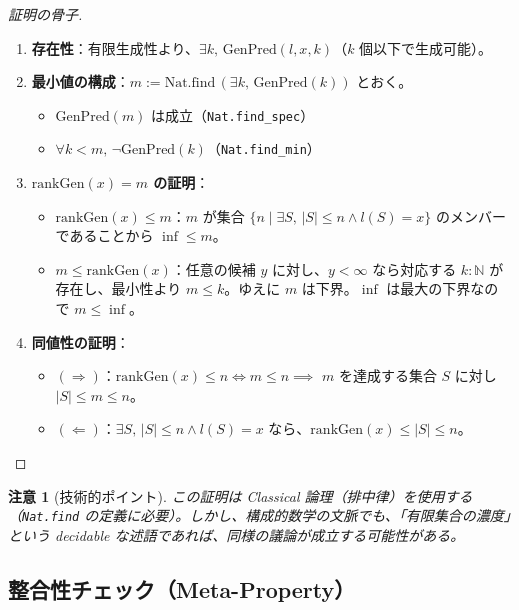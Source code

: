 \documentclass[a4paper,12pt]{ltjsarticle}
\newtheorem{remark}[definition]{注意}
\newcommand{\N}{\mathbb{N}}
\begin{document}
\begin{proof}[証明の骨子]
\begin{enumerate}
  \item \textbf{存在性}：有限生成性より、$\exists k,\, \mathrm{GenPred}(l, x, k)$（$k$ 個以下で生成可能）。

  \item \textbf{最小値の構成}：$m := \mathrm{Nat.find}\, (\exists k,\, \mathrm{GenPred}(k))$ とおく。
  \begin{itemize}
    \item $\mathrm{GenPred}(m)$ は成立（\texttt{Nat.find\_spec}）
    \item $\forall k < m,\, \neg \mathrm{GenPred}(k)$（\texttt{Nat.find\_min}）
  \end{itemize}

  \item \textbf{$\mathrm{rankGen}(x) = m$ の証明}：
  \begin{itemize}
    \item $\mathrm{rankGen}(x) \le m$：$m$ が集合 $\{n \mid \exists S,\, |S| \le n \land l(S) = x\}$ のメンバーであることから $\inf \le m$。
    \item $m \le \mathrm{rankGen}(x)$：任意の候補 $y$ に対し、$y < \infty$ なら対応する $k : \N$ が存在し、最小性より $m \le k$。ゆえに $m$ は下界。$\inf$ は最大の下界なので $m \le \inf$。
  \end{itemize}

  \item \textbf{同値性の証明}：
  \begin{itemize}
    \item $(\Rightarrow)$：$\mathrm{rankGen}(x) \le n \iff m \le n \implies$ $m$ を達成する集合 $S$ に対し $|S| \le m \le n$。
    \item $(\Leftarrow)$：$\exists S,\, |S| \le n \land l(S) = x$ なら、$\mathrm{rankGen}(x) \le |S| \le n$。\qedhere
  \end{itemize}
\end{enumerate}
\end{proof}

\begin{remark}[技術的ポイント]
この証明は Classical 論理（排中律）を使用する（\texttt{Nat.find} の定義に必要）。しかし、構成的数学の文脈でも、「有限集合の濃度」という decidable な述語であれば、同様の議論が成立する可能性がある。
\end{remark}

\subsection{整合性チェック（Meta-Property）}
\end{document}
